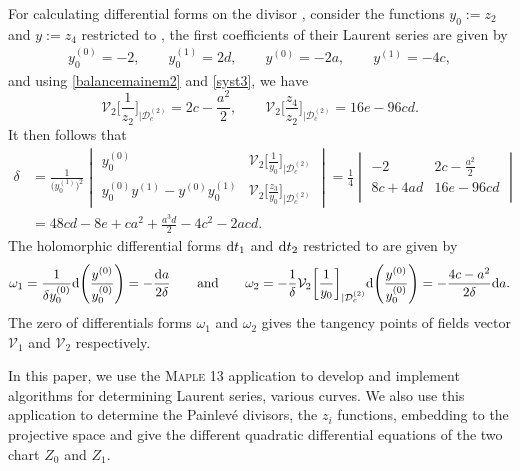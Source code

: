 \documentclass[10pt,a4paper]{amsart}
\numberwithin{equation}{section}
\begin{document}
 For calculating differential forms on the divisor
, consider the functions $y_0:=z_2$
and $y:=z_4$ restricted to , the
first coefficients of their Laurent series are given by
 \begin{gather*}
  y_0^{(0)}= -2, \qquad   y_0^{(1)}= 2d,\qquad
  y^{(0)}= -2a, \qquad   y^{(1)}=-4c,
 \end{gather*}
 and using \eqref{balancemainem2} and \eqref{syst3},
 we have \[\mathcal{V}_2\biggl[\frac{1}{z_2}\biggr]_{|\mathcal{D}_c^{(2)}}=2c-\frac{a^2}{2}, \qquad
 \mathcal{V}_2\biggl[\frac{z_4}{z_2}\biggr]_{|\mathcal{D}_c^{(2)}}=16e-96cd.\]
It then follows that
\begin{align*}
 \delta &{}= \frac{1}{\bigl(y_0^{(1)}\bigr)^2}
 \begin{vmatrix}
 y_0^{(0)} & \mathcal{V}_2\bigl[\frac{1}{y_0}\bigr]_{|\mathcal{D}_c^{(2)}} \\[1mm]
 y_0^{(0)}y^{(1)}-y^{(0)}y_0^{(1)} & \mathcal{V}_2\bigl[\frac{z_3}{y_0}\bigr]_{|\mathcal{D}_c^{(2)}}
 \end{vmatrix}
 = \frac{1}{4}
 \begin{vmatrix}
 -2 & 2c-\frac{a^2}{2} \\
 8c+4ad & 16e-96cd \\
 \end{vmatrix}\\
 &{}= 48cd-8e+ca^2+\frac{a^3d}{2}-4c^2-2acd.
\end{align*}
The holomorphic differential forms ${\rm d}t_1$ and ${\rm d}t_2$ restricted to
 are given by
\begin{gather*}
 \omega_1 = \frac{1}{\delta y_0^{(0)}}{\rm d}\Biggl(\frac{y^{(0)}}{y_0^{(0)}}\Biggr)=-\frac{{\rm d}a}{2\delta }
 \qquad \text{and} \qquad
 \omega_2 = -\frac{1}{\delta }\mathcal{V}_2\biggl[\frac{1}{y_0}\biggr]_{|\mathcal{D}_c^{(2)}}
 {\rm d}\Biggl(\frac{y^{(0)}}{y_0^{(0)}}\Biggr)=-\frac{4c-a^2}{2\delta}{\rm d}a.
\end{gather*}
The zero of differentials forms $\omega_1$ and $\omega_2$ gives the
tangency points of fields vector $\mathcal{V}_1$ and $\mathcal{V}_2$
respectively.

\begin{Remark}
In this paper, we use the \textsc{Maple} 13 application to develop and
implement algorithms for determining Laurent series, various curves.
We also use this application to determine the Painlev\'{e} divisors,
the $z_i$ functions, embedding to the projective space and give
the different quadratic differential equations of the two chart
$Z_0$ and $Z_1$.
\end{Remark}
\end{document}
